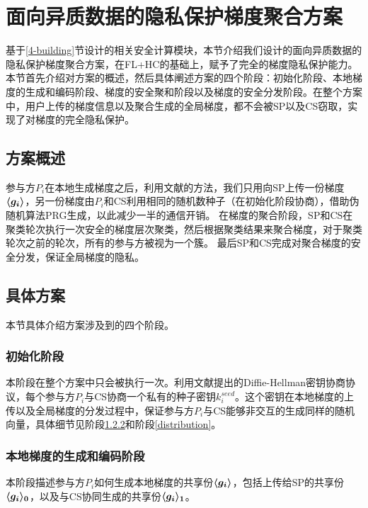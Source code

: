 \section{面向异质数据的隐私保护梯度聚合方案}\label{4-framework}
基于\ref{4-building}节设计的相关安全计算模块，本节介绍我们设计的面向异质数据的隐私保护梯度聚合方案，在FL+HC\cite{briggs2020federated}的基础上，赋予了完全的梯度隐私保护能力。
本节首先介绍对方案的概述，然后具体阐述方案的四个阶段：初始化阶段、本地梯度的生成和编码阶段、梯度的安全聚和阶段以及梯度的安全分发阶段。在整个方案中，用户上传的梯度信息以及聚合生成的全局梯度，都不会被SP以及CS窃取，实现了对梯度的完全隐私保护。

\subsection{方案概述}
参与方$P_i$在本地生成梯度之后，利用文献\cite{hao2021efficient}的方法，我们只用向SP上传一份梯度$\svec{g_i}$，另一份梯度由$P_i$和CS利用相同的随机数种子（在初始化阶段协商），借助伪随机算法PRG生成，以此减少一半的通信开销。
在梯度的聚合阶段，SP和CS在聚类轮次执行一次安全的梯度层次聚类，然后根据聚类结果来聚合梯度，对于聚类轮次之前的轮次，所有的参与方被视为一个簇。
最后SP和CS完成对聚合梯度的安全分发，保证全局梯度的隐私。

\subsection{具体方案}
本节具体介绍方案涉及到的四个阶段。%

\subsubsection{初始化阶段}
本阶段在整个方案中只会被执行一次。利用文献\cite{diffie2022new}提出的Diffie-Hellman密钥协商协议，每个参与方$P_i$与CS协商一个私有的种子密钥$k_i^{seed}$。这个密钥在本地梯度的上传以及全局梯度的分发过程中，保证参与方$P_i$与CS能够非交互的生成同样的随机向量，具体细节见阶段\ref{local}和阶段\ref{distribution}。

\subsubsection{本地梯度的生成和编码阶段}\label{local}
本阶段描述参与方$P_i$如何生成本地梯度的共享份$\svec{g_i}$，包括上传给SP的共享份$\svec[0]{g_i}$，以及与CS协同生成的共享份$\svec[1]{g_i}$。


